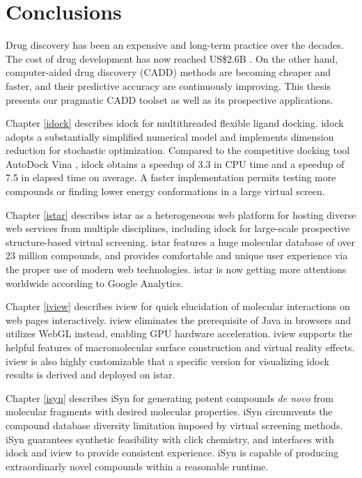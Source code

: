\chapter{Conclusions}

Drug discovery has been an expensive and long-term practice over the decades. The cost of drug development has now reached US\$2.6B \citep{1611}. On the other hand, computer-aided drug discovery (CADD) methods are becoming cheaper and faster, and their predictive accuracy are continuously improving. This thesis presents our pragmatic CADD toolset as well as its prospective applications.

Chapter \ref{idock} describes idock \citep{1153} for multithreaded flexible ligand docking. idock adopts a substantially simplified numerical model and implements dimension reduction for stochastic optimization. Compared to the competitive docking tool AutoDock Vina \citep{595}, idock obtains a speedup of 3.3 in CPU time and a speedup of 7.5 in elapsed time on average. A faster implementation permits testing more compounds or finding lower energy conformations in a large virtual screen.

Chapter \ref{istar} describes istar \citep{1362} as a heterogeneous web platform for hosting diverse web services from multiple disciplines, including idock for large-scale prospective structure-based virtual screening. istar features a huge molecular database of over 23 million compounds, and provides comfortable and unique user experience via the proper use of modern web technologies. istar is now getting more attentions worldwide according to Google Analytics.

Chapter \ref{iview} describes iview \citep{1366} for quick elucidation of molecular interactions on web pages interactively. iview eliminates the prerequisite of Java in browsers and utilizes WebGL instead, enabling GPU hardware acceleration. iview supports the helpful features of macromolecular surface construction and virtual reality effects. iview is also highly customizable that a specific version for visualizing idock results is derived and deployed on istar.

Chapter \ref{isyn} describes iSyn \citep{1409,1387} for generating potent compounds \textit{de novo} from molecular fragments with desired molecular properties. iSyn circumvents the compound database diversity limitation imposed by virtual screening methods. iSyn guarantees synthetic feasibility with click chemistry, and interfaces with idock and iview to provide consistent experience. iSyn is capable of producing extraordinarly novel compounds within a reasonable runtime.

